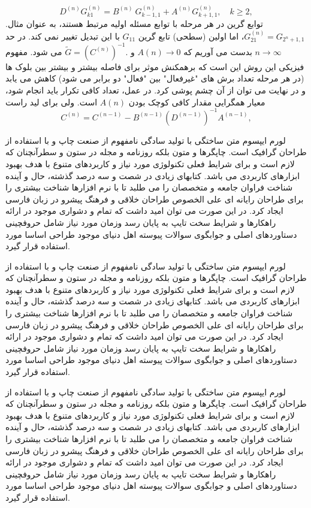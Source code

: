 \begin{equation}
	{{D}^{(n)}}G_{k1}^{(n)}={{B}^{(n)}}\ G_{k-1,1}^{(n)}+{{A}^{(n)}}G_{k+1,1}^{(n)},\quad k\ge 2,
\end{equation}
توابع گرین در هر مرحله با توابع مسئله اولیه مرتبط هستند، به عنوان مثال. $G_{21}^{(n)}={{G}_{{{2}^{n}}+1,1}}$، اما اولین (سطحی) تابع گرین $G_{11}$ با این تبدیل تغییر نمی کند.
در حد $n\to\infty$ بدست می آوریم که $A(n) \rightarrow 0$ و $\tilde{G}={{\left( {{C}^{(n)}} \right)}^{-1}}.$ می شود. مفهوم فیزیکی این روش این است که برهمکنش موثر برای فاصله بیشتر و بیشتر بین بلوک ها (در هر مرحله تعداد برش های "غیرفعال" بین "فعال" دو برابر می شود) کاهش می یابد و در نهایت می توان از آن چشم پوشی کرد. در عمل، تعداد کافی تکرار باید انجام شود، معیار همگرایی مقدار کافی کوچک بودن $A(n)$ است.
ولی برای لید راست 
\begin{equation}
    {{C}^{(n)}}={{C}^{(n-1)}}-{{B}^{(n-1)}}{{({{D}^{(n-1)}})}^{-1}}{{A}^{(n-1)}},
\end{equation}



لورم ایپسوم متن ساختگی با تولید سادگی نامفهوم از صنعت چاپ و با استفاده از طراحان گرافیک است. چاپگرها و متون بلکه روزنامه و مجله در ستون و سطرآنچنان که لازم است و برای شرایط فعلی تکنولوژی مورد نیاز و کاربردهای متنوع با هدف بهبود ابزارهای کاربردی می باشد. کتابهای زیادی در شصت و سه درصد گذشته، حال و آینده شناخت فراوان جامعه و متخصصان را می طلبد تا با نرم افزارها شناخت بیشتری را برای طراحان رایانه ای علی الخصوص طراحان خلاقی و فرهنگ پیشرو در زبان فارسی ایجاد کرد. در این صورت می توان امید داشت که تمام و دشواری موجود در ارائه راهکارها و شرایط سخت تایپ به پایان رسد وزمان مورد نیاز شامل حروفچینی دستاوردهای اصلی و جوابگوی سوالات پیوسته اهل دنیای موجود طراحی اساسا مورد استفاده قرار گیرد.

لورم ایپسوم متن ساختگی با تولید سادگی نامفهوم از صنعت چاپ و با استفاده از طراحان گرافیک است. چاپگرها و متون بلکه روزنامه و مجله در ستون و سطرآنچنان که لازم است و برای شرایط فعلی تکنولوژی مورد نیاز و کاربردهای متنوع با هدف بهبود ابزارهای کاربردی می باشد. کتابهای زیادی در شصت و سه درصد گذشته، حال و آینده شناخت فراوان جامعه و متخصصان را می طلبد تا با نرم افزارها شناخت بیشتری را برای طراحان رایانه ای علی الخصوص طراحان خلاقی و فرهنگ پیشرو در زبان فارسی ایجاد کرد. در این صورت می توان امید داشت که تمام و دشواری موجود در ارائه راهکارها و شرایط سخت تایپ به پایان رسد وزمان مورد نیاز شامل حروفچینی دستاوردهای اصلی و جوابگوی سوالات پیوسته اهل دنیای موجود طراحی اساسا مورد استفاده قرار گیرد.

لورم ایپسوم متن ساختگی با تولید سادگی نامفهوم از صنعت چاپ و با استفاده از طراحان گرافیک است. چاپگرها و متون بلکه روزنامه و مجله در ستون و سطرآنچنان که لازم است و برای شرایط فعلی تکنولوژی مورد نیاز و کاربردهای متنوع با هدف بهبود ابزارهای کاربردی می باشد. کتابهای زیادی در شصت و سه درصد گذشته، حال و آینده شناخت فراوان جامعه و متخصصان را می طلبد تا با نرم افزارها شناخت بیشتری را برای طراحان رایانه ای علی الخصوص طراحان خلاقی و فرهنگ پیشرو در زبان فارسی ایجاد کرد. در این صورت می توان امید داشت که تمام و دشواری موجود در ارائه راهکارها و شرایط سخت تایپ به پایان رسد وزمان مورد نیاز شامل حروفچینی دستاوردهای اصلی و جوابگوی سوالات پیوسته اهل دنیای موجود طراحی اساسا مورد استفاده قرار گیرد.

